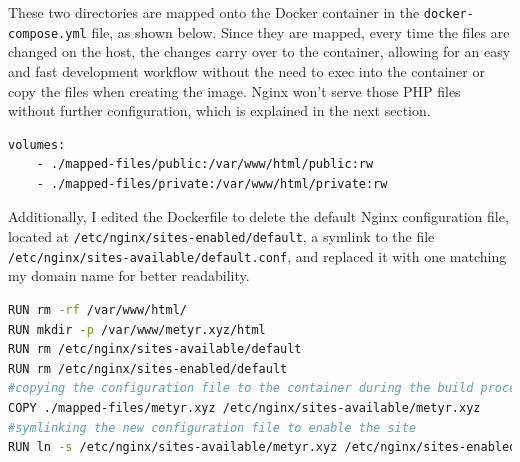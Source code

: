 \documentclass[a4paper]{article}
\begin{document}
These two directories are mapped onto the Docker container in the \texttt{docker-compose.yml} file, as shown below. Since they are mapped, every time the files are changed on the host, the changes carry over to the container, allowing for an easy and fast development workflow without the need to exec into the container or copy the files when creating the image.
Nginx won't serve those PHP files without further configuration, which is explained in the next section.
\begin{lstlisting}[language=bash]
volumes:
    - ./mapped-files/public:/var/www/html/public:rw
    - ./mapped-files/private:/var/www/html/private:rw
\end{lstlisting}
Additionally, I edited the Dockerfile to delete the default Nginx configuration file, located at \texttt{/etc/nginx/sites-enabled/default}, a symlink to the file \texttt{/etc/nginx/sites-available/default.conf}, and replaced it with one matching my domain name for better readability.\newpage
\begin{lstlisting}[language=bash]
RUN rm -rf /var/www/html/
RUN mkdir -p /var/www/metyr.xyz/html
RUN rm /etc/nginx/sites-available/default
RUN rm /etc/nginx/sites-enabled/default
#copying the configuration file to the container during the build process
COPY ./mapped-files/metyr.xyz /etc/nginx/sites-available/metyr.xyz
#symlinking the new configuration file to enable the site
RUN ln -s /etc/nginx/sites-available/metyr.xyz /etc/nginx/sites-enabled/metyr.xyz
\end{lstlisting}
\end{document}

